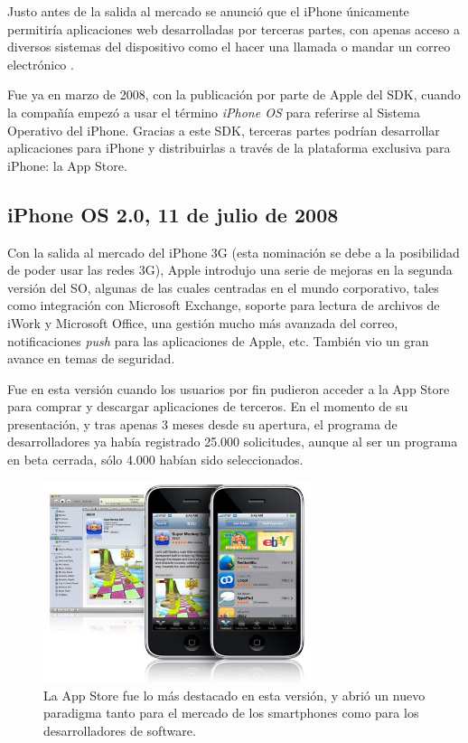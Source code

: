 Justo antes de la salida al mercado se anunció que el iPhone únicamente permitiría aplicaciones web desarrolladas por terceras partes, con apenas acceso a diversos sistemas del dispositivo como el hacer una llamada o mandar un correo electrónico \cite{iPhoneWebApps}.

Fue ya en marzo de 2008, con la publicación por parte de Apple del SDK, cuando la compañía empezó a usar el término \emph{iPhone OS} para referirse al Sistema Operativo del iPhone. Gracias a este SDK, terceras partes podrían desarrollar aplicaciones para iPhone y distribuirlas a través de la plataforma exclusiva para iPhone: la App Store.

\subsection{iPhone OS 2.0, 11 de julio de 2008}
Con la salida al mercado del iPhone 3G (esta nominación se debe a la posibilidad de poder usar las redes 3G), Apple introdujo una serie de mejoras en la segunda versión del SO, algunas de las cuales centradas en el mundo corporativo, tales como integración con Microsoft Exchange, soporte para lectura de archivos de iWork y Microsoft Office, una gestión mucho más avanzada del correo, notificaciones \emph{push} para las aplicaciones de Apple, etc. También vio un gran avance en temas de seguridad.

Fue en esta versión cuando los usuarios por fin pudieron acceder a la App Store para comprar y descargar aplicaciones de terceros. En el momento de su presentación, y tras apenas 3 meses desde su apertura, el programa de desarrolladores ya había registrado 25.000 solicitudes, aunque al ser un programa en beta cerrada, sólo 4.000 habían sido seleccionados.

\begin{figure}[h]
	\centering
		\includegraphics[width=0.7\textwidth]{./img/iOS2-AppStore.jpg}
	\caption{La App Store fue lo más destacado en esta versión, y abrió un nuevo paradigma tanto para el mercado de los smartphones como para los desarrolladores de software.}
\end{figure}

